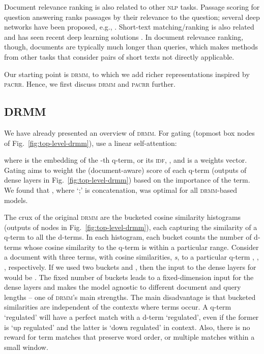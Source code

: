 \documentclass[11pt,a4paper]{article}
\newcommand{\nlp}{\textsc{nlp}\xspace}
\newcommand{\drmm}{\textsc{drmm}\xspace}
\newcommand{\pacrr}{\textsc{pacrr}\xspace}
\newcommand{\idf}{\textsc{idf}\xspace}
\begin{document}
Document relevance ranking is also related to other \nlp tasks. Passage scoring for question answering \cite{surdeanu2008learning} ranks passages 
by their relevance to the question; several deep networks have been proposed, e.g., .
Short-text matching/ranking is also related and has seen recent deep learning solutions \cite{lu2013deep,hu2014convolutional,severyn2015learning}.
In document relevance ranking, though, documents are typically much longer than queries, which makes methods from other tasks that consider pairs of short texts not directly applicable.

Our starting point is \drmm, to which we add richer representations inspired by \pacrr. Hence, we first discuss \drmm and \pacrr further. 



\subsection{DRMM}
\label{sec:drmm}

We have already presented an overview of \drmm. For gating (topmost box nodes of Fig.~\ref{fig:top-level-drmm}),  use a linear self-attention:

where  is the embedding  of the -th q-term, 
or its \idf, , and  is a weights vector. Gating aims to weight the (document-aware) score of each q-term
(outputs of dense layers in Fig.~\ref{fig:top-level-drmm}) based on the importance of the term. We found that   
, where `;' is concatenation, was optimal for all \drmm-based models.

The crux of the original \drmm are the bucketed cosine similarity histograms (outputs of  nodes in Fig.~\ref{fig:top-level-drmm}), each capturing the similarity of a 
q-term to all the d-terms. In each histogram, each bucket counts the number of d-terms whose cosine similarity to the q-term is within a particular range. Consider a document with three terms, with cosine similarities, \textit{s}, to a particular q-term  , , , respectively. If we used two buckets 
 and ,
then the input to the dense layers for  would be .
The fixed number of buckets leads to a fixed-dimension input for the dense layers and makes the model agnostic to different document and query lengths -- one of \drmm's main strengths.
The main disadvantage is that bucketed similarities are independent of the contexts where terms occur. 
A q-term `regulated' will have a perfect match with a d-term `regulated', even if the former is `up regulated' and the latter is `down regulated' in context. 
Also, there is no reward for term matches that preserve word order, or multiple matches within a small window.
\end{document}
